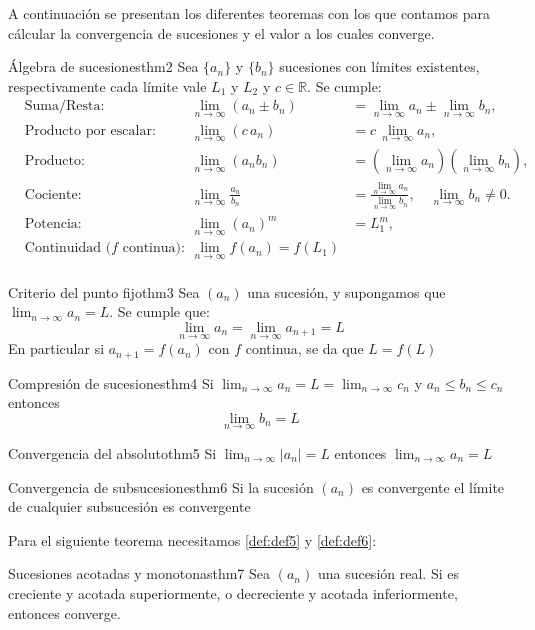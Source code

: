 \documentclass[12pt,a4paper]{article}
\begin{document}
A continuación se presentan los diferentes teoremas con los que contamos para cálcular la convergencia de sucesiones y el valor a los cuales converge.

\begin{teorema}{Álgebra de sucesiones}{thm2}
    Sea $\{a_n\}$ y $\{b_n\}$ sucesiones con límites existentes, respectivamente cada límite vale $L_1$ y $L_2$ y $c\in\mathbb{R}$. Se cumple:
    \[
    \begin{aligned}
        &\text{Suma/Resta:} & \lim_{n \to \infty} (a_n \pm b_n) &= \lim_{n \to \infty} a_n \pm \lim_{n \to \infty} b_n,\\
        &\text{Producto por escalar:} & \lim_{n \to \infty} (c\,a_n) &= c\,\lim_{n \to \infty} a_n,\\
        &\text{Producto:} & \lim_{n \to \infty} (a_n b_n) &= (\lim_{n \to \infty} a_n)(\lim_{n \to \infty} b_n),\\
        &\text{Cociente:} & \lim_{n \to \infty} \frac{a_n}{b_n} &= \frac{\lim\limits_{n \to \infty} a_n}{\lim\limits_{n \to \infty} b_n}, \quad \lim_{n\to\infty} b_n \neq 0. \\
        &\text{Potencia:} & \lim_{n \to \infty} (a_n)^m &= L_1^m,\\
        &\text{Continuidad ($f$ continua): } & \lim_{n \to \infty}f(a_n) = f(L_1) \\
    \end{aligned}
    \]
\end{teorema}

\begin{teorema}{Criterio del punto fijo}{thm3}
    Sea $(a_n)$ una sucesión, y supongamos que $\lim_{n \to \infty} a_n = L$. Se cumple que:
    \[ 
        \lim_{n \to \infty} a_n = \lim_{n \to \infty} a_{n + 1} = L
    \]
    En particular si $a_{n + 1} = f(a_n)$ con $f$ continua, se da que $L = f(L)$
\end{teorema}

\begin{teorema}{Compresión de sucesiones}{thm4}
    Si $\lim_{n \to \infty} a_n = L = \lim_{n \to \infty} c_n$ y $a_n \leq b_n \leq c_n$ entonces
    \[ 
        \lim_{n \to \infty} b_n = L
    \]
\end{teorema}

\begin{teorema}{Convergencia del absoluto}{thm5}
    Si $\lim_{n \to \infty} \lvert a_n \rvert = L$ entonces $\lim_{n \to \infty} a_n = L$
\end{teorema}

\begin{teorema}{Convergencia de subsucesiones}{thm6}
    Si la sucesión $(a_n)$ es convergente el límite de cualquier subsucesión es convergente
\end{teorema}

Para el siguiente teorema necesitamos \ref{def:def5} y \ref{def:def6}:

\begin{teorema}{Sucesiones acotadas y monotonas}{thm7}
    Sea $(a_n)$ una sucesión real. 
    Si es creciente y acotada superiormente, o decreciente y acotada inferiormente, entonces converge.
\end{teorema}
\end{document}
